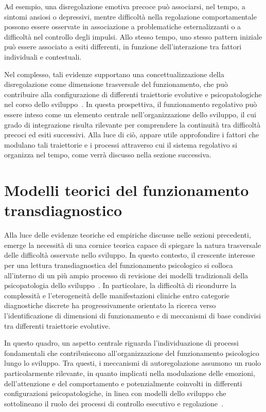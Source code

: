             Ad esempio, una disregolazione emotiva precoce può associarsi, nel tempo, a sintomi ansiosi o depressivi, mentre difficoltà nella regolazione comportamentale possono essere osservate in associazione a problematiche esternalizzanti o a difficoltà nel controllo degli impulsi. Allo stesso tempo, uno stesso pattern iniziale può essere associato a esiti differenti, in funzione dell'interazione tra fattori individuali e contestuali.

            Nel complesso, tali evidenze supportano una concettualizzazione della disregolazione come dimensione trasversale del funzionamento, che può contribuire alla configurazione di differenti traiettorie evolutive e psicopatologiche nel corso dello sviluppo~\cite{beauchaine2019,rutter1989,nigg2017}. In questa prospettiva, il funzionamento regolativo può essere inteso come un elemento centrale nell'organizzazione dello sviluppo, il cui grado di integrazione risulta rilevante per comprendere la continuità tra difficoltà precoci ed esiti successivi. Alla luce di ciò, appare utile approfondire i fattori che modulano tali traiettorie e i processi attraverso cui il sistema regolativo si organizza nel tempo, come verrà discusso nella sezione successiva.

    \section{Modelli teorici del funzionamento transdiagnostico}
    \label{sec:2_4}

        Alla luce delle evidenze teoriche ed empiriche discusse nelle sezioni precedenti, emerge la necessità di una cornice teorica capace di spiegare la natura trasversale delle difficoltà osservate nello sviluppo. In questo contesto, il crescente interesse per una lettura transdiagnostica del funzionamento psicologico si colloca all'interno di un più ampio processo di revisione dei modelli tradizionali della psicopatologia dello sviluppo~\cite{nolenhoeksema2011,astle2022}. In particolare, la difficoltà di ricondurre la complessità e l'eterogeneità delle manifestazioni cliniche entro categorie diagnostiche discrete ha progressivamente orientato la ricerca verso l'identificazione di dimensioni di funzionamento e di meccanismi di base condivisi tra differenti traiettorie evolutive.

        In questo quadro, un aspetto centrale riguarda l'individuazione di processi fondamentali che contribuiscono all'organizzazione del funzionamento psicologico lungo lo sviluppo. Tra questi, i meccanismi di autoregolazione assumono un ruolo particolarmente rilevante, in quanto implicati nella modulazione delle emozioni, dell'attenzione e del comportamento e potenzialmente coinvolti in differenti configurazioni psicopatologiche, in linea con modelli dello sviluppo che sottolineano il ruolo dei processi di controllo esecutivo e regolazione~\cite{diamond2013,zelazo2015}.

